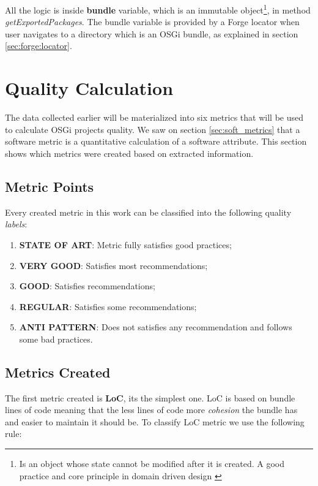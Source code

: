 All the logic is inside \textbf{bundle} variable, which is an immutable object\footnote{Is an object whose state cannot be modified after it is created. A good practice and core principle in domain driven design \citep{Evans 2003}}, in method \emph{getExportedPackages}. The bundle variable is provided by a Forge locator when user navigates to a directory which is an OSGi bundle, as explained in section \ref{sec:forge:locator}. 

\section{Quality Calculation}
The data collected earlier will be materialized into six metrics that will be used to calculate OSGi projects quality. We saw on section \ref{sec:soft_metrics} that a software metric is a quantitative calculation of a software attribute. This section shows which metrics were created based on extracted information.


\subsection{Metric Points}
Every created metric in this work can be classified into the following quality \emph{labels}:

\begin{enumerate}
\item \textbf{STATE OF ART}: Metric fully satisfies good practices;
\item \textbf{VERY GOOD}: Satisfies most recommendations;
\item \textbf{GOOD}: Satisfies recommendations;
\item \textbf{REGULAR}: Satisfies some recommendations;
\item \textbf{ANTI PATTERN}: Does not satisfies any recommendation and follows some bad practices.
\end{enumerate}

\subsection{Metrics Created}

The first metric created is \textbf{LoC}, its the simplest one. LoC is based on bundle lines of code meaning that the less lines of code more \emph{cohesion} the bundle has and easier to maintain it should be. To classify LoC metric we use the following rule:\newline


